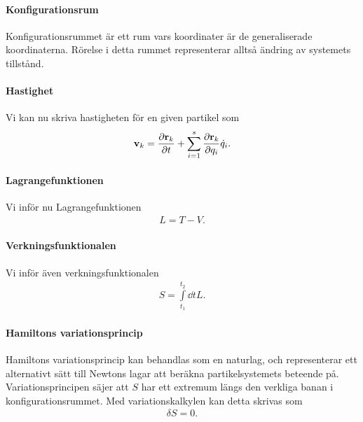 \paragraph{Konfigurationsrum}
Konfigurationsrummet är ett rum vars koordinater är de generaliserade koordinaterna. Rörelse i detta rummet representerar alltså ändring av systemets tillstånd.

\paragraph{Hastighet}
Vi kan nu skriva hastigheten för en given partikel som
\begin{align*}
	\vb{v}_{k} = \pdv{\vb{r}_{k}}{t} + \sum\limits_{i = 1}^{s}\pdv{\vb{r}_{k}}{q_{i}}\dot{q}_{i}.
\end{align*}

\paragraph{Lagrangefunktionen}
Vi inför nu Lagrangefunktionen
\begin{align*}
	L = T - V.
\end{align*}

\paragraph{Verkningsfunktionalen}
Vi inför även verkningsfunktionalen
\begin{align*}
	S = \int\limits_{t_{1}}^{t_{2}}\dd{t}L.
\end{align*}

\paragraph{Hamiltons variationsprincip}
Hamiltons variationsprincip kan behandlas som en naturlag, och representerar ett alternativt sätt till Newtons lagar att beräkna partikelsystemets beteende på. Variationsprincipen säjer att $S$ har ett extremum längs den verkliga banan i konfigurationsrummet. Med variationskalkylen kan detta skrivas som
\begin{align*}
	\delta S = 0.
\end{align*}

